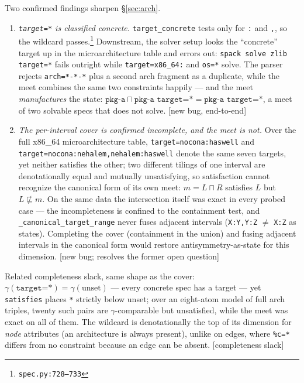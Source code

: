 \documentclass[11pt]{article}
\theoremstyle{definition}
\theoremstyle{remark}
\newcommand{\sat}{\sqsubseteq}
\newcommand{\meet}{\sqcap}
\newcommand{\code}[1]{\texttt{#1}}
\newcommand{\src}[1]{\footnote{\code{#1}}}
\begin{document}
Two confirmed findings sharpen \S\ref{sec:arch}.

\begin{enumerate}[itemsep=3pt]
\item \emph{\code{target=*} is classified concrete.}
\code{target\_concrete} tests only for \code{:} and \code{,}, so the wildcard
passes.\src{spec.py:728--733}  Downstream, the solver setup looks the
``concrete'' target up in the microarchitecture table and errors out:
\code{spack solve zlib target=*} fails outright while \code{target=x86\_64:}
and \code{os=*} solve.  The parser rejects \code{arch=*-*-*} plus a second
arch fragment as a duplicate, while the meet combines the same two
constraints happily --- and the meet \emph{manufactures} the state:
$\code{pkg-a} \meet \code{pkg-a target=*} = \code{pkg-a target=*}$, a meet of
two solvable specs that does not solve.  [new bug, end-to-end]
\item \emph{The per-interval cover is confirmed incomplete, and the meet is
not.}  Over the full x86\_64 microarchitecture table,
\code{target=nocona:haswell} and
\code{target=nocona:nehalem,}\allowbreak\code{nehalem:haswell}
denote the same seven targets, yet neither satisfies the other; two
different tilings of one interval are denotationally equal and mutually
unsatisfying, so satisfaction cannot recognize the canonical form of its own
meet: $m = L \meet R$ satisfies $L$ but $L \not\sat m$.  On the same data the
intersection itself was exact in every probed case --- the incompleteness is
confined to the containment test, and \code{\_canonical\_target\_range} never
fuses adjacent intervals (\code{X:Y,Y:Z} $\neq$ \code{X:Z} as states).
Completing the cover (containment in the union) and fusing adjacent
intervals in the canonical form would restore antisymmetry-as-state for this
dimension.  [new bug; resolves the former open question]
\end{enumerate}

Related completeness slack, same shape as the cover: $\gamma(\code{target=*})
= \gamma(\text{unset})$ --- every concrete spec has a target --- yet
\code{satisfies} places \code{*} strictly below unset; over an eight-atom
model of full arch triples, twenty such pairs are $\gamma$-comparable but
unsatisfied, while the meet was exact on all of them.  The wildcard is
denotationally the top of its dimension for \emph{node} attributes (an
architecture is always present), unlike on edges, where \code{\%c=*} differs
from no constraint because an edge can be absent.  [completeness slack]
\end{document}

